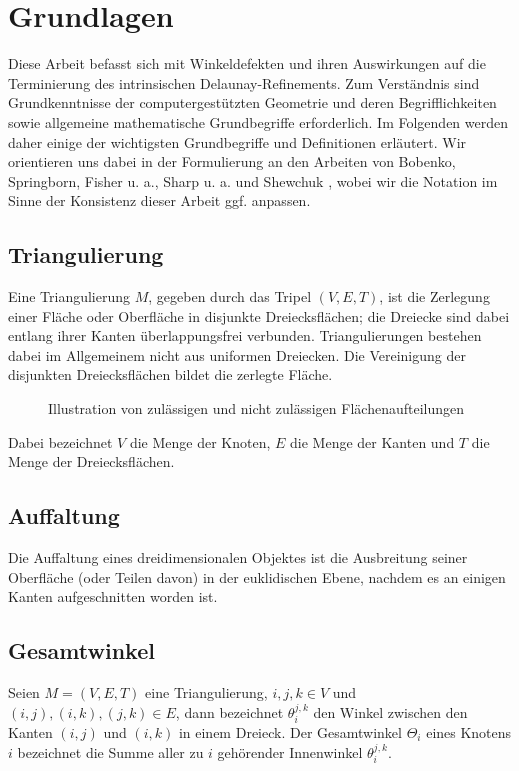 \chapter{ Grundlagen}
Diese Arbeit befasst sich mit Winkeldefekten und ihren Auswirkungen auf die Terminierung des intrinsischen Delaunay-Refinements. Zum Verständnis sind Grundkenntnisse der computergestützten Geometrie und deren Begrifflichkeiten sowie allgemeine mathematische Grundbegriffe erforderlich. Im Folgenden werden daher einige der wichtigsten Grundbegriffe und Definitionen erläutert. Wir orientieren uns dabei in der
Formulierung an den Arbeiten von 
 Bobenko, Springborn, Fisher u. a., Sharp u. a. und Shewchuk
 \cite{Bobenko:2006:SIGGRAPH,Sharp:2019:NIT,Bobenko:2007:LaplaceBeltrami,shewchuk:1997:delaunay,SHEWCHUK:2002:chuws},
wobei wir die Notation im Sinne der Konsistenz dieser Arbeit ggf. anpassen.

\section*{Triangulierung}

Eine Triangulierung $M$, gegeben durch das Tripel $  (V, E, T) $, ist die Zerlegung einer Fläche oder Oberfläche in disjunkte Dreiecksflächen; die Dreiecke sind dabei entlang ihrer Kanten überlappungsfrei verbunden.
Triangulierungen bestehen dabei im Allgemeinem nicht aus uniformen Dreiecken.
Die Vereinigung der disjunkten Dreiecksflächen bildet die zerlegte Fläche. \\  

\begin{figure}[h]%
    \centering
  
  \caption{Illustration von zulässigen und nicht zulässigen Flächenaufteilungen}
\end{figure}

Dabei bezeichnet  $V$ die Menge der Knoten, $E$ die Menge der Kanten und $T$ die Menge der Dreiecksflächen.


\section*{Auffaltung}
Die Auffaltung eines dreidimensionalen Objektes ist die Ausbreitung seiner Oberfläche (oder Teilen davon) in der euklidischen Ebene, nachdem es an einigen Kanten aufgeschnitten worden ist. 

\section*{Gesamtwinkel}
\label{def:gesamtwinkel}
Seien $M = (V, E, T)$ eine Triangulierung, $i,j,k \in V$ und $(i, j),(i, k),(j, k) \in E$, dann bezeichnet $\theta_i^{j,k}$ den Winkel zwischen den Kanten  $(i, j)$ und $(i, k)$ in einem Dreieck. Der Gesamtwinkel $ \Theta_i$ eines Knotens $i$ bezeichnet die Summe aller zu $i$ gehörender Innenwinkel $\theta_i^{j,k}$.

